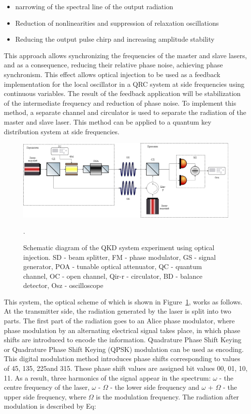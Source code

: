 \begin{itemize}
    \item narrowing of the spectral line of the output radiation
    \item Reduction of nonlinearities and suppression of relaxation oscillations
    \item Reducing the output pulse chirp and increasing amplitude stability
\end{itemize}
This approach allows synchronizing the frequencies of the master and slave lasers, and as a consequence, reducing their relative phase noise, achieving phase synchronism. This effect allows optical injection to be used as a feedback implementation for the local oscillator in a QRC system at side frequencies using continuous variables. The result of the feedback application will be stabilization of the intermediate frequency and reduction of phase noise. To implement this method, a separate channel and circulator is used to separate the radiation of the master and slave laser. 
This method can be applied to a quantum key distribution system at side frequencies.
\begin{figure}
    \centering
    \includegraphics[width=\textwidth]{images/Схема с обратной связью.png}
    \caption{Schematic diagram of the QKD system experiment using optical injection. SD - beam splitter, FM - phase modulator, GS - signal generator, POA - tunable optical attenuator, QC - quantum channel, OC - open channel, Qir-r - circulator, BD - balance detector, Osz - oscilloscope}.
    \label{fig:opt inj scheme syn}
\end{figure}
This system, the optical scheme of which is shown in Figure~\ref{fig:opt inj scheme syn}, works as follows. At the transmitter side, the radiation generated by the laser is split into two parts. The first part of the radiation goes to an Alice phase modulator, where phase modulation by an alternating electrical signal takes place, in which phase shifts are introduced to encode the information. Quadrature Phase Shift Keying or Quadrature Phase Shift Keying (QPSK) modulation can be used as encoding. This digital modulation method introduces phase shifts corresponding to values of 45\textdegree, 135\textdegree, 225\textdegree and 315\textdegree. These phase shift values are assigned bit values {00, 01, 10, 11}. As a result, three harmonics of the signal appear in the spectrum: $\omega$ - the centre frequency of the laser, $\omega$ - $\Omega$ - the lower side frequency and $\omega$ + $\Omega$ - the upper side frequency, where $\Omega$ is the modulation frequency. The radiation after modulation is described by Eq:
